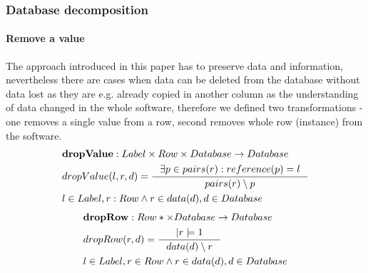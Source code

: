 \documentclass[11pt]{article}
\begin{document}
\subsubsection{Database decomposition}
\paragraph{Remove a value}  The approach introduced in this paper has to  preserve data and information, nevertheless there are cases when data can be deleted from the database without data lost as they are e.g. already copied in another column as the understanding of data changed in the whole software, therefore we defined two transformations - one removes a single value from a row, second removes whole row (instance) from the software.
\begin{align*}
&	\mathbf{dropValue} : Label \times Row \times Database \rightarrow Database \\
&	dropValue(l, r, d) = \inference{\exists p \in pairs(r) : reference(p) = l}{pairs(r) \setminus p}\\ 
& l \in Label, r : Row \wedge r \in data(d), d \in Database
\end{align*}
\begin{align*}
&	\mathbf{dropRow} :  Row*  \times Database \rightarrow Database\\
&	dropRow(r, d) = \inference{|r|=1}{data(d) \setminus r}	\\ 
& l \in Label, r \in Row \wedge r \in data(d), d \in Database
\end{align*}
\end{document}
